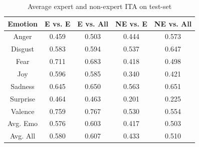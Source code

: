\documentclass[11pt]{article}
\newlength{\tableReduceBot}
\begin{document}
\begin{table}[h]
\footnotesize
    \begin{center}
        \begin{tabular}{|c||c|c||c|c|}
        \hline
        Emotion & E vs. E & E vs. All & NE vs. E & NE vs. All \\
        \hline
        Anger & 0.459 & 0.503 & 0.444 & 0.573 \\
        Disgust & 0.583 & 0.594 & 0.537 & 0.647 \\
        Fear & 0.711 & 0.683 & 0.418 & 0.498 \\
        Joy & 0.596 & 0.585 & 0.340 & 0.421 \\
        Sadness & 0.645 & 0.650 & 0.563 & 0.651 \\
        Surprise & 0.464 & 0.463 & 0.201 & 0.225 \\
        Valence & 0.759 & 0.767 & 0.530 &  0.554 \\
        \hline
        Avg. Emo & 0.576 & 0.603 & 0.417 & 0.503 \\
        Avg. All & 0.580 & 0.607 &  0.433 &  0.510 \\
        \hline
        
        \end{tabular}
    \caption{Average expert and non-expert ITA on test-set}\label{affectITA1}
\end{center}
\end{table}
\end{document}
